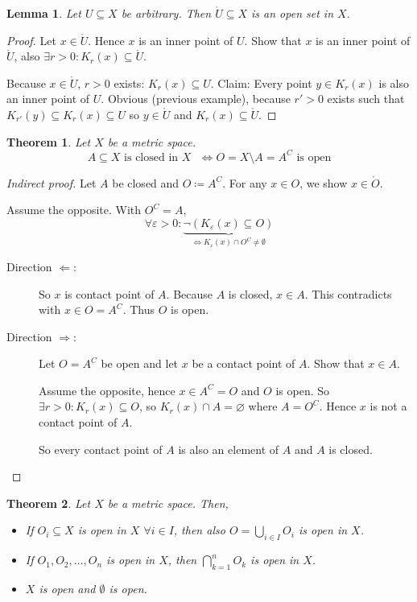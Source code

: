 \documentclass{article}
\newtheorem{theorem}{Theorem}  \numberwithin{theorem}{section}
\newtheorem{lemma}{Lemma}  \numberwithin{lemma}{section}
\begin{document}
\begin{lemma}
  Let $U \subseteq X$ be arbitrary. Then $\mathring{U} \subseteq X$ is an open set in $X$.
\end{lemma}
\begin{proof}
  Let $x \in \mathring{U}$. Hence $x$ is an inner point of $U$.
  Show that $x$ is an inner point of $\mathring{U}$, also $\exists r > 0: K_r(x) \subseteq \mathring{U}$.

  Because $x \in \mathring U$, $r > 0$ exists: $K_r(x) \subseteq U$.
  Claim: Every point $y \in K_r(x)$ is also an inner point of $U$.
  Obvious (previous example), because $r' > 0$ exists such that
  $K_{r'}(y) \subseteq K_r(x) \subseteq U$ so $y \in \mathring U$ and $K_r(x) \subseteq \mathring U$.
\end{proof}

\begin{theorem}
  \label{saetzchen1}
  Let $X$ be a metric space.
  \[ A \subseteq X \text{ is closed in $X$ } \iff O = X \setminus A = A^C \text{ is open} \]
\end{theorem}

\begin{proof}[Indirect proof]
  Let $A$ be closed and $O \coloneqq A^C$. For any $x \in O$, we show $x \in \mathring O$.

  Assume the opposite. With $O^C = A$,
  \[ \forall \varepsilon > 0: \underbrace{\neg \left(K_{\varepsilon}(x) \subseteq O\right)}_{\iff K_{\varepsilon}(x) \cap O^C \neq \emptyset} \]

  \begin{description}
    \item[Direction $\mathbf\Leftarrow$:]
      So $x$ is contact point of $A$.
      Because $A$ is closed, $x \in A$.
      This contradicts with $x \in O = A^C$. Thus $O$ is open.

    \item[Direction $\mathbf\Rightarrow$:]
      Let $O = A^C$ be open and let $x$ be a contact point of $A$. Show that $x \in A$.

      Assume the opposite, hence $x \in A^C = O$ and $O$ is open.
      So $\exists r > 0: K_r(x) \subseteq O$, so $K_r(x) \cap A = \diameter$ where $A = O^C$.
      Hence $x$ is not a contact point of $A$.

      So every contact point of $A$ is also an element of $A$ and $A$ is closed.
  \end{description}
\end{proof}

\begin{theorem}
  \label{satz2}
  Let $X$ be a metric space. Then,
  \begin{itemize}
    \item
      If $O_i \subseteq X$ is open in $X$ $\forall i \in I$,
      then also $O = \bigcup_{i \in I} O_i$ is open in $X$.
    \item
      If $O_1, O_2, \dots, O_n$ is open in $X$, then $\bigcap_{k=1}^n O_k$ is open in $X$.
    \item
      $X$ is open and $\emptyset$ is open.
  \end{itemize}
\end{theorem}
\end{document}
